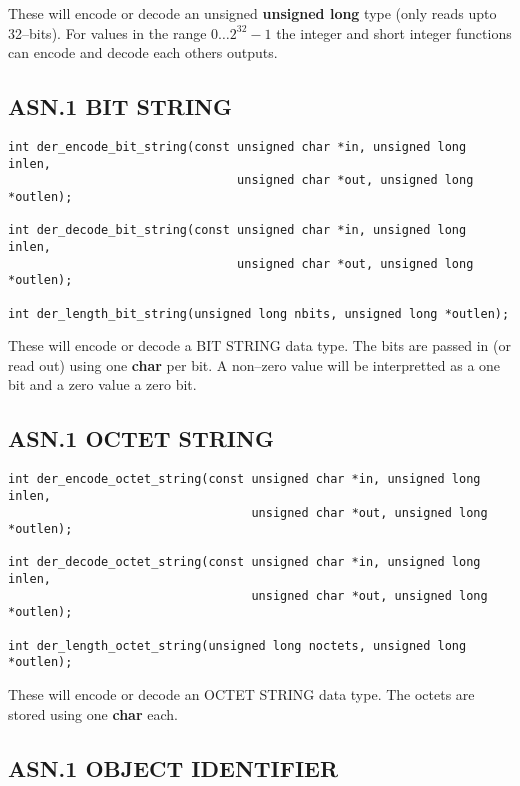 \documentclass[a4paper]{book}
\begin{document}
These will encode or decode an unsigned \textbf{unsigned long} type (only reads upto 32--bits).  For values in the range $0 \dots 2^{32} - 1$ the integer 
and short integer functions can encode and decode each others outputs.  

\subsection{ASN.1 BIT STRING}

\begin{verbatim}
int der_encode_bit_string(const unsigned char *in, unsigned long inlen,
                                unsigned char *out, unsigned long *outlen);

int der_decode_bit_string(const unsigned char *in, unsigned long inlen,
                                unsigned char *out, unsigned long *outlen);

int der_length_bit_string(unsigned long nbits, unsigned long *outlen);
\end{verbatim}

These will encode or decode a BIT STRING data type.  The bits are passed in (or read out) using one \textbf{char} per bit.  A non--zero value will be interpretted
as a one bit and a zero value a zero bit.

\subsection{ASN.1 OCTET STRING}

\begin{verbatim}
int der_encode_octet_string(const unsigned char *in, unsigned long inlen,
                                  unsigned char *out, unsigned long *outlen);

int der_decode_octet_string(const unsigned char *in, unsigned long inlen,
                                  unsigned char *out, unsigned long *outlen);

int der_length_octet_string(unsigned long noctets, unsigned long *outlen);
\end{verbatim}

These will encode or decode an OCTET STRING data type.  The octets are stored using one \textbf{char} each.  

\subsection{ASN.1 OBJECT IDENTIFIER}
\end{document}
